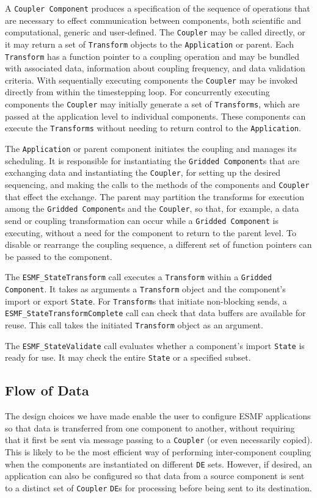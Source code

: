 A {\tt Coupler Component} produces a specification of the sequence of 
operations that are necessary to effect communication between components, 
both scientific and computational, generic and user-defined.  The {\tt Coupler} 
may be called directly, or it may return a set of {\tt Transform} objects to 
the {\tt Application} or parent.  Each {\tt Transform} has a
function pointer to a coupling operation and may be bundled with 
associated data, information about coupling frequency, and 
data validation criteria. With sequentially executing components the {\tt Coupler}
may be invoked directly from within the timestepping loop.  For concurrently executing
components the {\tt Coupler} may initially generate a set of {\tt Transforms}, which 
are passed at the application level to individual components.  These components
can execute the {\tt Transforms} without needing to return control to the 
{\tt Application}.

The {\tt Application} or parent component initiates the coupling and manages 
its scheduling.  It is responsible for instantiating the {\tt Gridded Component}s
that are exchanging data and instantiating the {\tt Coupler}, for setting up the desired 
sequencing, and making the calls to the methods of the components and 
{\tt Coupler} that effect the exchange.  The parent may partition the 
transforms
for execution among the {\tt Gridded Component}s and the {\tt Coupler}, so that, for 
example, a data send or coupling transformation can occur while a {\tt Gridded 
Component} is executing, without a need for the component to return to the
parent level.  
To disable or rearrange the coupling sequence, a different set of function
pointers can be passed to the component.

The {\tt ESMF\_StateTransform} call executes a {\tt Transform} 
within a {\tt Gridded Component}.  It takes as arguments a
{\tt Transform} object and the component's import or export {\tt State}.  
For {\tt Transform}s that initiate non-blocking sends, a {\tt ESMF\_StateTransformComplete} 
call can check that data  buffers are available for reuse.  This 
call takes the initiated {\tt Transform} object as an argument.

The {\tt ESMF\_StateValidate} call evaluates whether a component's 
import {\tt State} is ready for use.  It may check the entire {\tt State} or 
a specified subset.

\subsection{Flow of Data}
\label{sec:dataflow}
The design choices we have made enable the user to configure ESMF
applications so that data is transferred from one component to another, 
without requiring that it first be sent via message passing to a
{\tt Coupler} (or even necessarily
copied).  This is likely to be the most efficient way of performing 
inter-component coupling when the components are instantiated on different
{\tt DE} sets.  However, if desired, an application can also be configured so that
data from a source component is sent to a distinct set of {\tt Coupler} 
{\tt DE}s for processing before being sent to its destination.

